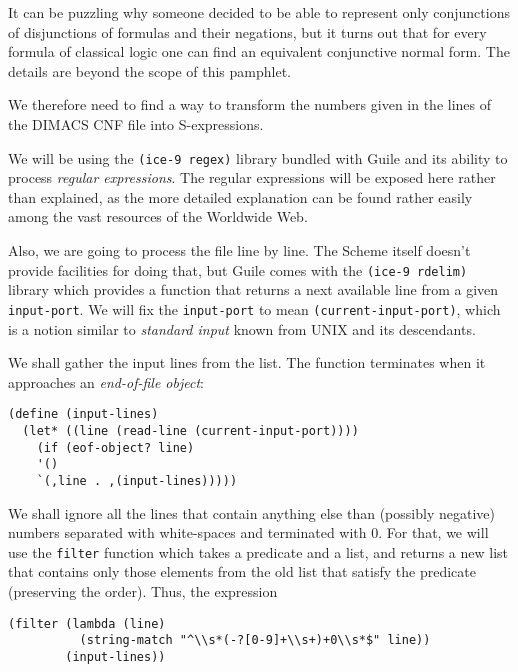 It can be puzzling why someone decided to be able to represent
only conjunctions of disjunctions of formulas and their negations,
but it turns out that for every formula of classical logic
one can find an equivalent conjunctive normal form. The details
are beyond the scope of this pamphlet.

We therefore need to find a way to transform the numbers
given in the lines of the DIMACS CNF file into S-expressions.

We will be using the \texttt{(ice-9 regex)} library bundled 
with Guile and its ability to process \textit{regular expressions}.
The regular expressions will be exposed here rather than explained,
as the more detailed explanation can be found rather easily
among the vast resources of the Worldwide Web.

Also, we are going to process the file line by line. The
Scheme itself doesn't provide facilities for doing that,
but Guile comes with the \texttt{(ice-9 rdelim)} library
which provides a function that returns a next available line
from a given \texttt{input-port}. We will fix the
\texttt{input-port} to mean \texttt{(current-input-port)},
which is a notion similar to \textit{standard input} known
from UNIX and its descendants.

We shall gather the input lines from the list. The
function terminates when it approaches an \textit{end-of-file
object}:

\begin{Verbatim}[samepage=true]
(define (input-lines)
  (let* ((line (read-line (current-input-port))))
    (if (eof-object? line)
	'()
	`(,line . ,(input-lines)))))
\end{Verbatim}

We shall ignore all the lines that contain anything else
than (possibly negative) numbers separated with white-spaces
and terminated with 0. For that, we will use the \texttt{filter}
function which takes a predicate and a list, and returns
a new list that contains only those elements from the old
list that satisfy the predicate (preserving the order).
Thus, the expression

\begin{Verbatim}[samepage=true]
(filter (lambda (line)
          (string-match "^\\s*(-?[0-9]+\\s+)+0\\s*$" line))
        (input-lines))
\end{Verbatim}

